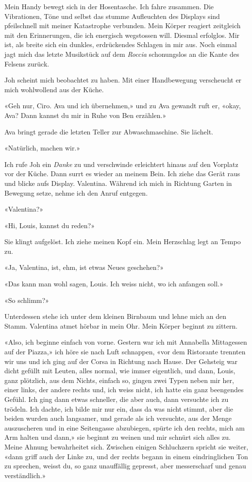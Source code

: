 Mein Handy bewegt sich in der Hosentasche. Ich fahre zusammen. Die
Vibrationen, Töne und selbst das stumme Aufleuchten des Displays sind
pfeilschnell mit meiner Katastrophe verbunden. Mein Körper reagiert
zeitgleich mit den Erinnerungen, die ich energisch wegstossen will.
Diesmal erfolglos. Mir ist, als breite sich ein dunkles, erdrückendes
Schlagen in mir aus. Noch einmal jagt mich das letzte Musikstück auf dem
\emph{Roccia}  schonungslos an die Kante des Felsens zurück.


Joh scheint mich beobachtet zu haben. Mit einer Handbewegung verscheucht
er mich wohlwollend aus der Küche.

«Geh nur, Ciro. Ava und ich übernehmen,» und zu Ava gewandt ruft er,
«okay, Ava? Dann kannst du mir in Ruhe von Ben erzählen.»

Ava bringt gerade die letzten Teller zur Abwaschmaschine.
Sie lächelt.

«Natürlich, machen wir.»

Ich rufe Joh ein \emph{Danke} zu und verschwinde erleichtert hinaus auf
den Vorplatz vor der Küche. Dann surrt es wieder an meinem Bein. Ich
ziehe das Gerät raus und blicke aufs Display. Valentina. Während ich
mich in Richtung Garten in Bewegung setze, nehme ich den Anruf entgegen.

«Valentina?»

«Hi, Louis, kannst du reden?»

Sie klingt aufgelöst. Ich ziehe meinen Kopf ein. Mein Herzschlag legt an Tempo zu.

«Ja, Valentina, ist, ehm, ist etwas Neues geschehen?»

«Das kann man wohl sagen, Louis. Ich weiss nicht, wo ich anfangen soll.»

«So schlimm?»

Unterdessen stehe ich unter dem kleinen Birnbaum und lehne mich an den
Stamm.
Valentina atmet hörbar in mein Ohr. Mein Körper beginnt zu zittern.

«Also, ich beginne einfach von vorne. Gestern war ich mit Annabella
Mittagessen auf der Piazza,» ich höre sie nach Luft schnappen, «vor dem
Ristorante trennten wir uns und ich ging auf der Corsa in Richtung nach
Hause. Der Gehsteig war dicht gefüllt mit Leuten, alles normal, wie
immer eigentlich, und dann, Louis, ganz plötzlich, aus dem Nichts,
einfach so, gingen zwei Typen neben mir her, einer links, der andere rechts
und, ich weiss nicht, ich hatte ein ganz beengendes Gefühl. Ich ging
dann etwas schneller, die aber auch, dann versuchte ich zu trödeln. Ich
dachte, ich bilde mir nur ein, dass da was nicht stimmt, aber die beiden
wurden auch langsamer, und gerade als ich versuchte, aus der Menge
auszuscheren und in eine Seitengasse abzubiegen, spürte ich den rechts,
mich am Arm halten und dann,» sie beginnt zu weinen und mir schnürt sich
alles zu. Meine Ahnung bewahrheitet sich. Zwischen einigen Schluchzern
spricht sie weiter, «dann griff auch der Linke zu, und der rechts begann
in einem eindringlichen Ton zu sprechen, weisst du, so ganz unauffällig
gepresst, aber messerscharf und genau verständlich.»

